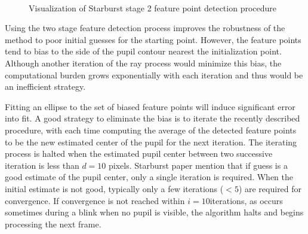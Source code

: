 \documentclass[12pt,fleqn]{book} %
\begin{document}
\begin{figure}[h]
\begin{dBox}
\centering
  \mbox{
   }
   \caption{Visualization of Starburst stage 2 feature point detection procedure \label{fig:starburst_stage2_example} }   
\end{dBox}   
\end{figure}

Using the two stage feature detection process improves the robustness of the method to poor initial guesses for the starting point. However, the feature points tend to bias to the side of the pupil contour nearest the initialization point. Although another iteration of the ray process would minimize this bias, the computational burden grows exponentially with each iteration and thus would be an inefficient strategy. \bigskip

Fitting an ellipse to the set of biased feature points will induce significant error into fit. A good strategy to eliminate the bias is to iterate the recently described procedure, with each time computing the average of the detected feature points to be the new estimated center of the pupil for the next iteration. The iterating process is halted when the estimated pupil center between two successive iteration is less than $d = 10$ pixels. Starburst paper mention that if guess is a good estimate of the pupil center, only a single iteration is required. When the initial estimate is not good, typically only a few iterations ($< 5$) are required for convergence. If convergence is not reached within $i = 10 $iterations, as occurs sometimes during a blink when no pupil is visible, the algorithm halts and begins processing the next frame. \bigskip
\end{document}
